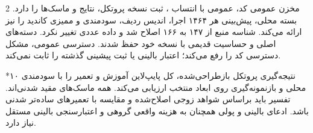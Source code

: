\documentclass[10pt,a4paper]{article}
\makeatletter
\renewcommand{\section}{\@startsection{section}{1}{0pt}{5pt}{2pt}{\normalfont\normalsize\bfseries}}
\newcommand{\sect}[1]{\section*{#1}}
\makeatother
\begin{document}
\begin{multicols}{2}
مخزن عمومی  کد،  عمومی با انتساب ، ثبت نسخه پروتکل، نتایج و ماسک‌ها را دارد. بسته محلی، پیش‌بینی هر ۱۴۶۴ اجرا، اندیس ردیف، سودمندی و ممیزی کاندید را نیز ارائه می‌کند. شناسه منبع  از ۱۴۷ به ۱۶۶ اصلاح شد و داده عددی  تغییر نکرد. دسته‌های اصلی و حساسیت قدیمی با نسخه خود حفظ شدند. دسترسی عمومی، مشکل دسترسی کد را رفع می‌کند؛ اعتبار بالینی یا ثبت پیشینی گذشته را ثابت نمی‌کند.

\sect{۱۰  نتیجه‌گیری}
پروتکل بازطراحی‌شده، کل پایپ‌لاین آموزش و تعمیر را با سودمندی محلی و بازنمونه‌گیری روی ابعاد منتخب ارزیابی می‌کند. همه ماسک‌های مقید شدنی‌اند. تفسیر باید براساس شواهد زوجی اصلاح‌شده و مقایسه با تعمیرهای ساده‌تر شدنی باشد. ادعای بالینی و پولی همچنان به هزینه واقعی گروهی و اعتبارسنجی بالینی مستقل نیاز دارد.


\end{multicols}
\end{document}
